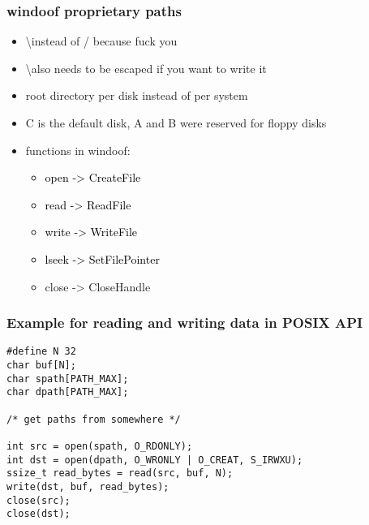 \documentclass[main.tex,fontsize=8pt,paper=a4,paper=portrait,DIV=calc,]{scrartcl}
\begin{document}
\subsubsection{windoof proprietary paths}
\begin{itemize}
  \item \textbackslash instead of / because fuck you
  \item \textbackslash also needs to be escaped if you want to write it
\item root directory per disk instead of per system
\item C is the default disk, A and B were reserved for floppy disks
\item functions in windoof: \newline
  \begin{itemize}
  \item \textcolor{black}{open -> CreateFile}
  \item \textcolor{black}{read -> ReadFile}
  \item \textcolor{black}{write -> WriteFile}
  \item \textcolor{black}{lseek -> SetFilePointer}
  \item close -> CloseHandle
  \end{itemize} 
\end{itemize} 

\subsubsection{Example for reading and writing data in POSIX API}
\begin{lstlisting}
#define N 32
char buf[N];
char spath[PATH_MAX];
char dpath[PATH_MAX];

/* get paths from somewhere */

int src = open(spath, O_RDONLY);
int dst = open(dpath, O_WRONLY | O_CREAT, S_IRWXU);
ssize_t read_bytes = read(src, buf, N);
write(dst, buf, read_bytes);
close(src);
close(dst);
\end{lstlisting}
\end{document}
